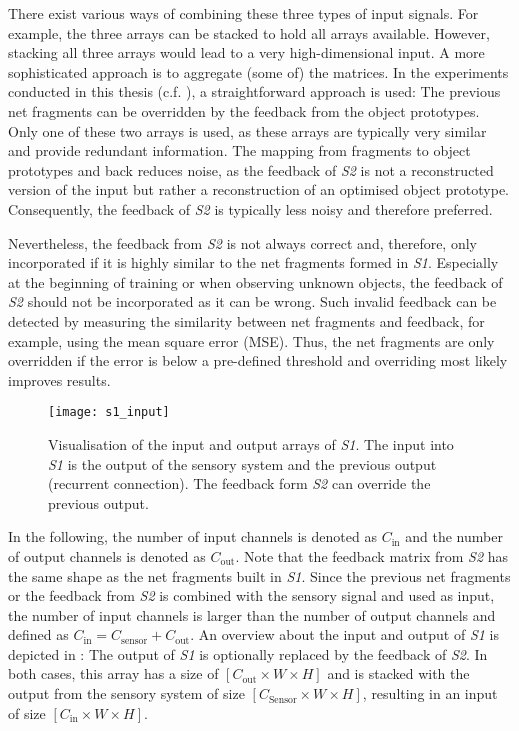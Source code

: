 There exist various ways of combining these three types of input signals. For example, the three arrays can be stacked to hold all arrays available.
However, stacking all three arrays would lead to a very high-dimensional input.
A more sophisticated approach is to aggregate (some of) the matrices.
In the experiments conducted in this thesis (c.f. ), a straightforward approach is used: The previous net fragments can be overridden by the feedback from the object prototypes.
Only one of these two arrays is used, as these arrays are typically very similar and provide redundant information. The mapping from fragments to object prototypes and back reduces noise, as the feedback of \emph{S2} is not a reconstructed version of the input but rather a reconstruction of an optimised object prototype. Consequently, the feedback of \emph{S2} is typically less noisy and therefore preferred.

Nevertheless, the feedback from \emph{S2} is not always correct and, therefore, only incorporated if it is highly similar to the net fragments formed in \emph{S1}. Especially at the beginning of training or when observing unknown objects, the feedback of \emph{S2} should not be incorporated as it can be wrong.
Such invalid feedback can be detected by measuring the similarity between net fragments and feedback, for example, using the mean square error (MSE). Thus, the net fragments are only overridden if the error is below a pre-defined threshold and overriding most likely improves results.

\begin{figure}[h]
    \centering
    \texttt{[image: s1\_input]}
    \caption[Input and output of \emph{S1}]{Visualisation of the input and output arrays of \emph{S1}. The input into \emph{S1} is the output of the sensory system and the previous output (recurrent connection). The feedback form \emph{S2} can override the previous output.}
\end{figure}


In the following, the number of input channels is denoted as $C_{\text{in}}$ and the number of output channels is denoted as $C_{\text{out}}$.
Note that the feedback matrix from \emph{S2} has the same shape as the net fragments built in \emph{S1}.
Since the previous net fragments or the feedback from \emph{S2} is combined with the sensory signal and used as input, the number of input channels is larger than the number of output channels and defined as $C_{\text{in}} = C_{\text{sensor}} + C_{\text{out}}$.
An overview about the input and output of \emph{S1} is depicted in :
The output of \emph{S1} is optionally replaced by the feedback of \emph{S2}. In both cases, this array has a size of $[C_{\text{out}} \times W \times H]$ and is stacked with the output from the sensory system of size $[C_{\text{Sensor}} \times W \times H]$, resulting in an input of size $[C_{\text{in}} \times W \times H]$.


